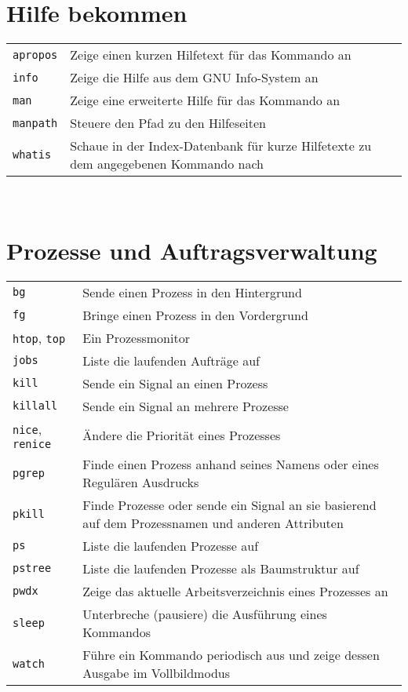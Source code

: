\documentclass[10pt,a4paper]{article}
\begin{document}
\begin{multicols}{2}   

\section{Hilfe bekommen\phantom{g}}
\begin{tabular}{ p{2.5cm} p{8.5cm} }
  \hline
  \texttt{apropos} & Zeige einen kurzen Hilfetext für das Kommando an \\
  \rowcolor{Gray}
  \texttt{info} & Zeige die Hilfe aus dem GNU Info-System an\\
  \texttt{man} & Zeige eine erweiterte Hilfe für das Kommando an \\
  \rowcolor{Gray}
  \texttt{manpath} & Steuere den Pfad zu den Hilfeseiten \\
  \texttt{whatis} & Schaue in der Index-Datenbank für kurze Hilfetexte zu dem angegebenen Kommando nach \\
  \hline
\end{tabular}

~ \\
\vfill

\section{Prozesse und Auftragsverwaltung}
\begin{tabular}{ p{2.5cm} p{8.5cm} }
  \hline
  \texttt{bg} & Sende einen Prozess in den Hintergrund \\
  \rowcolor{Gray}
  \texttt{fg} & Bringe einen Prozess in den Vordergrund \\
  \texttt{htop}, \texttt{top} & Ein Prozessmonitor \\
  \rowcolor{Gray}
  \texttt{jobs} & Liste die laufenden Aufträge auf \\
  \texttt{kill} & Sende ein Signal an einen Prozess \\
  \rowcolor{Gray}
  \texttt{killall} & Sende ein Signal an mehrere Prozesse\\
  \texttt{nice}, \texttt{renice} & Ändere die Priorität eines Prozesses \\
  \rowcolor{Gray}
  \texttt{pgrep} & Finde einen Prozess anhand seines Namens oder eines Regulären Ausdrucks \\
  \texttt{pkill} & Finde Prozesse oder sende ein Signal an sie basierend auf dem Prozessnamen und anderen Attributen\\
  \rowcolor{Gray}
  \texttt{ps} & Liste die laufenden Prozesse auf \\
  \texttt{pstree} & Liste die laufenden Prozesse als Baumstruktur auf \\
  \rowcolor{Gray}
  \texttt{pwdx} & Zeige das aktuelle Arbeitsverzeichnis eines Prozesses an \\
  \texttt{sleep} & Unterbreche (pausiere) die Ausführung eines Kommandos \\
  \rowcolor{Gray}
  \texttt{watch} & Führe ein Kommando periodisch aus und zeige dessen Ausgabe im Vollbildmodus \\
  \hline
\end{tabular}


\end{multicols}
\end{document}
